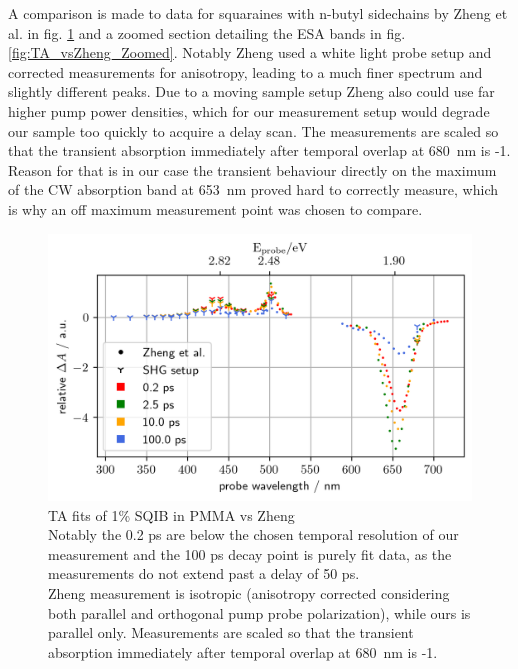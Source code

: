 \documentclass[twoside,openright]{scrreprt}
\begin{document}
A comparison is made to data for squaraines with n-butyl sidechains by Zheng et al.\cite{Zheng2020} in fig. \ref{fig:TA_vsZheng} and a zoomed section detailing the ESA bands in fig. \ref{fig:TA_vsZheng_Zoomed}. Notably Zheng used a white light probe setup and corrected measurements for anisotropy, leading to a much finer spectrum and slightly different peaks. Due to a moving sample setup Zheng also could use far higher pump power densities, which for our measurement setup would degrade our sample too quickly to acquire a delay scan. The measurements are scaled so that the transient absorption immediately after temporal overlap at \SI{680}{\nano\meter} is -1. Reason for that is in our case the transient behaviour directly on the maximum of the CW absorption band at \SI{653}{\nano\meter} proved hard to correctly measure, which is why an off maximum measurement point was chosen to compare.%

\begin{figure}[hbtp]
\centering
\includegraphics[scale=1]{images/wavScanVsZheng.png}
\caption{TA fits of 1\% SQIB in PMMA vs Zheng\protect\cite{Zheng2020}\\ Notably the 0.2 ps are below the chosen temporal resolution of our measurement and the 100 ps decay point is purely fit data, as the measurements do not extend past a delay of 50 ps.\\
Zheng measurement is isotropic (anisotropy corrected considering both parallel and orthogonal pump probe polarization), while ours is parallel only. Measurements are scaled so that the transient absorption immediately after temporal overlap at \SI{680}{\nano\meter} is -1.\label{fig:TA_vsZheng}}
\end{figure}
\end{document}
